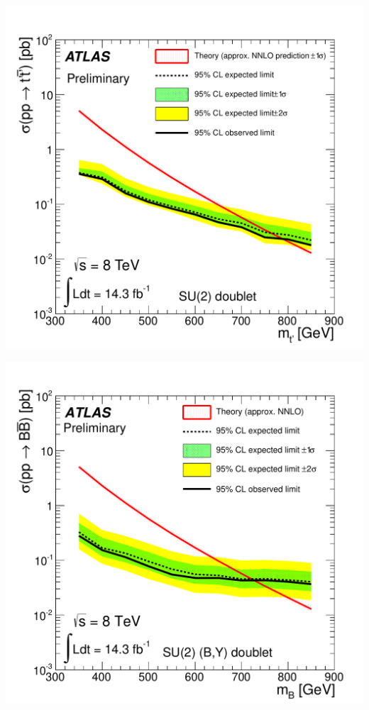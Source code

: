 \documentclass[xcolor=dvipsnames,10pt]{beamer}
\begin{document}
\begin{frame}
\begin{minipage}{.68\textwidth}
\begin{minipage}{.5\textwidth}\centering
\includegraphics[width=1.\textwidth]{htx/fig_05a}
\end{minipage}\begin{minipage}{.5\textwidth}\centering
\includegraphics[width=1.\textwidth]{ztag/fig_08b}
\end{minipage}




\end{minipage}

\end{frame}
\end{document}
